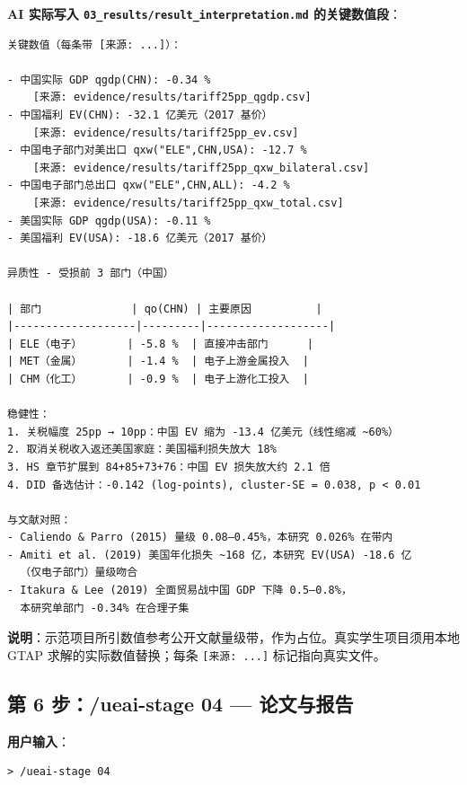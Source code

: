\documentclass[12pt,a4paper]{article}
\begin{document}
\noindent\textbf{AI 实际写入 \texttt{03\_results/result\_interpretation.md} 的关键数值段}：
\begin{lstlisting}[style=md]
关键数值（每条带 [来源: ...]）：

- 中国实际 GDP qgdp(CHN): -0.34 %
    [来源: evidence/results/tariff25pp_qgdp.csv]
- 中国福利 EV(CHN): -32.1 亿美元（2017 基价）
    [来源: evidence/results/tariff25pp_ev.csv]
- 中国电子部门对美出口 qxw("ELE",CHN,USA): -12.7 %
    [来源: evidence/results/tariff25pp_qxw_bilateral.csv]
- 中国电子部门总出口 qxw("ELE",CHN,ALL): -4.2 %
    [来源: evidence/results/tariff25pp_qxw_total.csv]
- 美国实际 GDP qgdp(USA): -0.11 %
- 美国福利 EV(USA): -18.6 亿美元（2017 基价）

异质性 - 受损前 3 部门（中国）

| 部门              | qo(CHN) | 主要原因          |
|-------------------|---------|-------------------|
| ELE（电子）       | -5.8 %  | 直接冲击部门      |
| MET（金属）       | -1.4 %  | 电子上游金属投入  |
| CHM（化工）       | -0.9 %  | 电子上游化工投入  |

稳健性：
1. 关税幅度 25pp → 10pp：中国 EV 缩为 -13.4 亿美元（线性缩减 ~60%）
2. 取消关税收入返还美国家庭：美国福利损失放大 18%
3. HS 章节扩展到 84+85+73+76：中国 EV 损失放大约 2.1 倍
4. DID 备选估计：-0.142 (log-points), cluster-SE = 0.038, p < 0.01

与文献对照：
- Caliendo & Parro (2015) 量级 0.08–0.45%，本研究 0.026% 在带内
- Amiti et al. (2019) 美国年化损失 ~168 亿，本研究 EV(USA) -18.6 亿
  （仅电子部门）量级吻合
- Itakura & Lee (2019) 全面贸易战中国 GDP 下降 0.5–0.8%，
  本研究单部门 -0.34% 在合理子集
\end{lstlisting}

\textbf{说明}：示范项目所引数值参考公开文献量级带，作为占位。真实学生项目须用本地 GTAP 求解的实际数值替换；每条 \texttt{[来源: ...]} 标记指向真实文件。

\subsection{第 6 步：/ueai-stage 04 — 论文与报告}

\noindent\textbf{用户输入}：
\begin{lstlisting}[style=prompt]
> /ueai-stage 04
\end{lstlisting}
\end{document}
